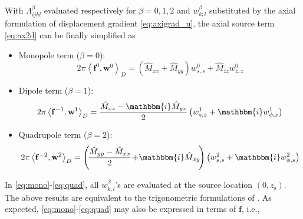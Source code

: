 \documentclass[extra,referee]{gji}
\begin{document}
With $\Lambda_{ijkl}^\beta$ evaluated respectively for $\beta=0,1,2$ and 
$w_{k;l}^\beta$ substituted by the axial formulation of displacement 
gradient \eqref{eq:axigrad_u}, the axial source term
\eqref{eq:ax2d} can be finally simplified as 
\begin{itemize}
  \item Monopole term ($\beta=0$):
  \begin{equation} 
    2\pi \left\langle \mathbf{f}^{0},\mathbf{w}^0 \right\rangle _{D}=
    \left(\hat{M}_{xx}+\hat{M}_{yy}\right)w_{s,s}^0+\hat{M}_{zz}w_{z,z}^0
    \label{eq:mono}
  \end{equation}
  \item Dipole term ($\beta=1$):
  \begin{equation} 
    2\pi \left\langle \mathbf{f}^{-1},\mathbf{w}^1 \right\rangle _{D}=
    \frac{\hat{M}_{xz}-\mathbbm{i}\hat{M}_{yz}}{2} 
    \left(w_{s,z}^1+\mathbbm{i}w_{\phi,z}^1\right)
    \label{eq:di}
  \end{equation}
  \item Quadrupole term ($\beta=2$):
  \begin{equation} 
    2\pi \left\langle \mathbf{f}^{-2},\mathbf{w}^2 \right\rangle _{D}=
    \left(\!\frac{\hat{M}_{yy}-\hat{M}_{xx}}{2}\!+\!\mathbbm{i}\hat{M}_{xy}\!\right) 
    \left(w_{s,s}^2+\mathbbm{i}w_{\phi,s}^2\right)
    \label{eq:quad}
  \end{equation}
\end{itemize}
In \eqref{eq:mono}-\eqref{eq:quad}, all $w_{k,l}^\beta$'s are evaluated at 
the source location $\left(0,z_\text{s}\right)$. 
The above results are equivalent to the trigonometric formulations of 
\cite{nissen2007axisem}.
As expected, \eqref{eq:mono}-\eqref{eq:quad} may also be expressed in terms of 
$\mathbf{f}$, i.e.,
\end{document}
